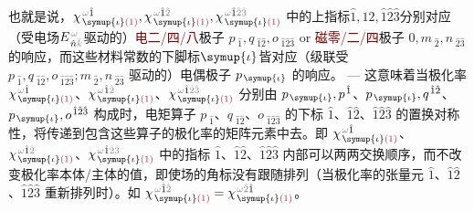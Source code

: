 也就是说，$\chi^{\;\! \mathcolor{gray}{\omega} \hat{1}}_{\;\! \symup{\iota} \textcolor{Maroon}{(1)}},\chi^{\;\! \mathcolor{gray}{\omega} \hat{1} \mathcolor{gray}{\hat{2}}}_{\;\! \symup{\iota} \textcolor{Maroon}{(1)}},\chi^{\;\! \mathcolor{gray}{\omega} \hat{1} \mathcolor{gray}{\hat{2} \hat{3}}}_{\;\! \symup{\iota} \textcolor{Maroon}{(1)}}$ 中的上指标$\hat{1},\hat{1} \hat{2},\hat{1} \hat{2} \hat{3}$分别对应（受电场$E^{\;\!\mathcolor{gray}{\omega}}_{\;\! \hat{n} \mathcolor{gray}{\bar{k}}}$驱动的）\textcolor{Maroon}{电二/四/八}极子 $p_{\;\! \hat{1}}, q_{\;\! \hat{1} \hat{2}}, o_{\;\! \hat{1} \hat{2} \hat{3}}$ or \textcolor{Maroon}{磁零/二/四}极子 $0, m_{\;\! \hat{2}}, n_{\;\! \hat{2} \hat{3}}$ 的响应，而这些材料常数的下脚标$\symup{\iota}$皆对应（级联受 $p_{\;\! \hat{1}}, q_{\;\! \hat{1} \hat{2}}, o_{\;\! \hat{1} \hat{2} \hat{3}}; m_{\;\! \hat{2}}, n_{\;\! \hat{2} \hat{3}}$ 驱动的）电偶极子 $p_{\;\! \symup{\iota}}$ 的响应。 --- 这意味着当极化率 $\chi^{\;\! \mathcolor{gray}{\omega} \hat{1}}_{\;\! \symup{\iota} \textcolor{Maroon}{(1)}}$、$\chi^{\;\! \mathcolor{gray}{\omega} \hat{1} \mathcolor{gray}{\hat{2}}}_{\;\! \symup{\iota} \textcolor{Maroon}{(1)}}$、$\chi^{\;\! \mathcolor{gray}{\omega} \hat{1} \mathcolor{gray}{\hat{2} \hat{3}}}_{\;\! \symup{\iota} \textcolor{Maroon}{(1)}}$ 分别由 $p_{\;\! \symup{\iota}}, p^{\;\! \hat{1}}$、$p_{\;\! \symup{\iota}}, q^{\;\! \hat{1} \hat{2}}$、$p_{\;\! \symup{\iota}}, o^{\;\! \hat{1} \hat{2} \hat{3}}$ 构成时，电矩算子 $p_{\;\! \hat{1}}$、$ q_{\;\! \hat{1} \hat{2}}$、$ o_{\;\! \hat{1} \hat{2} \hat{3}}$ 的下标 $\hat{1}$、$\hat{1} \hat{2}$、$\hat{1} \hat{2} \hat{3}$ 的置换对称性，将传递到包含这些算子的极化率的矩阵元素中去。即 $\chi^{\;\! \mathcolor{gray}{\omega} \hat{1}}_{\;\! \symup{\iota} \textcolor{Maroon}{(1)}}$、$\chi^{\;\! \mathcolor{gray}{\omega} \hat{1} \mathcolor{gray}{\hat{2}}}_{\;\! \symup{\iota} \textcolor{Maroon}{(1)}}$、$\chi^{\;\! \mathcolor{gray}{\omega} \hat{1} \mathcolor{gray}{\hat{2} \hat{3}}}_{\;\! \symup{\iota} \textcolor{Maroon}{(1)}}$ 中的指标 $\hat{1}$、$\hat{1} \hat{2}$、$\hat{1} \hat{2} \hat{3}$ 内部可以两两交换顺序，而不改变极化率本体/主体的值，即使场的角标没有跟随排列（当极化率的张量元 $\hat{1}$、$\hat{1} \hat{2}$、$\hat{1} \hat{2} \hat{3}$ 重新排列时）。如 $\chi^{\;\! \mathcolor{gray}{\omega} \hat{1} \mathcolor{gray}{\hat{2}}}_{\;\! \symup{\iota} \textcolor{Maroon}{(1)}} = \chi^{\;\! \mathcolor{gray}{\omega} \mathcolor{gray}{\hat{2}} \hat{1}}_{\;\! \symup{\iota} \textcolor{Maroon}{(1)}}$。

